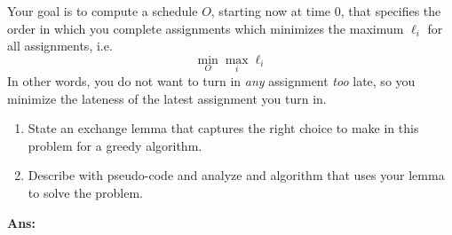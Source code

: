 \documentclass[11pt]{article}
\begin{document}
Your goal is to compute a schedule $O$, starting now at time 0, that specifies the order in which you complete assignments which minimizes the maximum $\ell_i$ for all assignments, i.e.
$$
\min_O \max_i \ell_i
$$
In other words, you do not want to turn in {\em any} assignment {\em too} late, so you minimize the lateness of the latest assignment you turn in.


\begin{enumerate}
    \item State an exchange lemma that captures the right choice to make in this problem for a greedy algorithm.
    
    \item Describe with pseudo-code and analyze and algorithm that uses your lemma to solve the problem.
\end{enumerate}
\textbf{Ans:}
\end{document}
